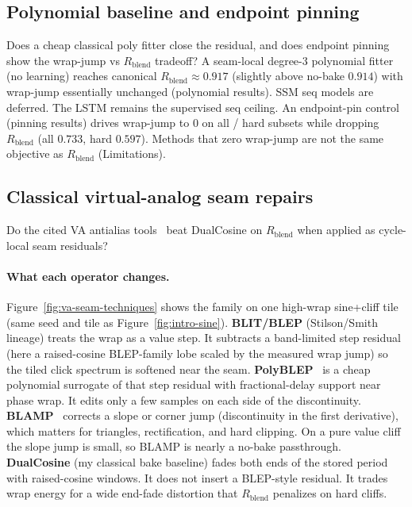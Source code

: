 \subsection{Polynomial baseline and endpoint pinning}
\label{sec:poly-jump}

Does a cheap classical poly fitter close the residual, and does endpoint pinning show the wrap-jump vs $R_{\mathrm{blend}}$ tradeoff?
A seam-local degree-3 polynomial fitter (no learning) reaches canonical $R_{\mathrm{blend}}\approx 0.917$ (slightly above no-bake $0.914$) with wrap-jump essentially unchanged (polynomial results).
SSM seq models are deferred. The LSTM remains the supervised seq ceiling.
An endpoint-pin control (pinning results) drives wrap-jump to $0$ on all / hard subsets while dropping $R_{\mathrm{blend}}$ (all $0.733$, hard $0.597$).
Methods that zero wrap-jump are not the same objective as $R_{\mathrm{blend}}$ (Limitations).

\subsection{Classical virtual-analog seam repairs}
\label{sec:va-seam-baselines}

Do the cited VA antialias tools~\citep{stilson1996,valimaki2007polyblep,esqueda2016blamp} beat DualCosine on $R_{\mathrm{blend}}$ when applied as cycle-local seam residuals?

\paragraph{What each operator changes.}
Figure~\ref{fig:va-seam-techniques} shows the family on one high-wrap sine{+}cliff tile (same seed and tile as Figure~\ref{fig:intro-sine}).
\textbf{BLIT/BLEP} (Stilson/Smith lineage) treats the wrap as a value step.
It subtracts a band-limited step residual (here a raised-cosine BLEP-family lobe scaled by the measured wrap jump) so the tiled click spectrum is softened near the seam.
\textbf{PolyBLEP}~\citep{valimaki2007polyblep} is a cheap polynomial surrogate of that step residual with fractional-delay support near phase wrap.
It edits only a few samples on each side of the discontinuity.
\textbf{BLAMP}~\citep{esqueda2016blamp} corrects a slope or corner jump (discontinuity in the first derivative), which matters for triangles, rectification, and hard clipping.
On a pure value cliff the slope jump is small, so BLAMP is nearly a no-bake passthrough.
\textbf{DualCosine} (my classical bake baseline) fades both ends of the stored period with raised-cosine windows.
It does not insert a BLEP-style residual.
It trades wrap energy for a wide end-fade distortion that $R_{\mathrm{blend}}$ penalizes on hard cliffs.

